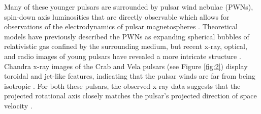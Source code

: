 \documentclass[12pt]{article}
\begin{document}
Many of these younger pulsars are surrounded by pulsar wind nebulae (PWNs), spin-down axis luminosities that are directly observable which allows for observations of the electrodynamics of pulsar magnetospheres \cite{pulsars}.
Theoretical models have previously described the PWNs as expanding spherical bubbles of relativistic gas confined by the surrounding medium, but recent x-ray, optical, and radio images of young pulsars have revealed a more intricate structure \cite{pulsars}.
Chandra x-ray images of the Crab and Vela pulsars (see Figure \ref{fig:2}) display toroidal and jet-like features, indicating that the pulsar winds are far from being isotropic \cite{pulsars}. For both these pulsars, the observed x-ray data suggests that the projected rotational axis closely matches the pulsar's projected direction of space velocity \cite{pulsars}.
\end{document}
